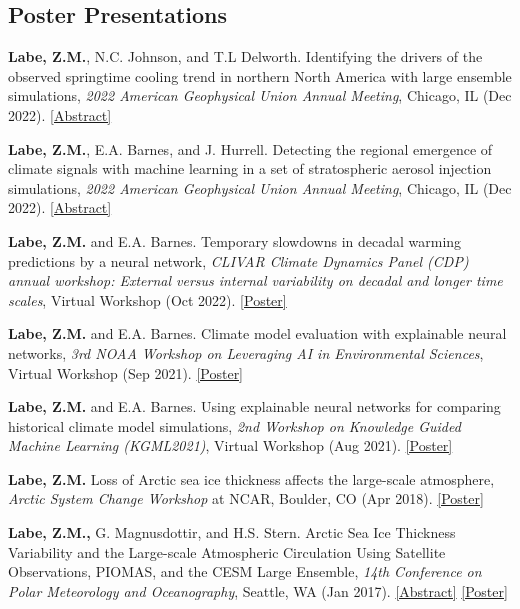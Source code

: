 \documentclass[margin,line,palatino,courier,10pt]{res}
\begin{document}
\begin{resume}
\section{\sc \textcolor{Cerulean}{\large{\textbf{Poster Presentations}}}}
\begin{etaremune}[leftmargin=0in,topsep=0in,parsep=0in]
\item \textbf{Labe, Z.M.}, N.C. Johnson, and T.L Delworth. Identifying the drivers of the observed springtime cooling trend in northern North America with large ensemble simulations, \textit{2022 American Geophysical Union Annual Meeting}, Chicago, IL (Dec 2022). \href{https://agu.confex.com/agu/fm22/meetingapp.cgi/Paper/1111909}{[Abstract]}
\item \textbf{Labe, Z.M.}, E.A. Barnes, and J. Hurrell. Detecting the regional emergence of climate signals with machine learning in a set of stratospheric aerosol injection simulations, \textit{2022 American Geophysical Union Annual Meeting}, Chicago, IL (Dec 2022). \href{https://agu.confex.com/agu/fm22/meetingapp.cgi/Paper/1110391}{[Abstract]}
\item \textbf{Labe, Z.M.} and E.A. Barnes. Temporary slowdowns in decadal warming predictions by a neural network, \textit{CLIVAR Climate Dynamics Panel (CDP) annual workshop: External versus internal variability on decadal and longer time scales}, Virtual Workshop (Oct 2022). \href{https://zacklabe.files.wordpress.com/2022/09/labebarnes_poster_10-2022.pdf}{[Poster]}
\item \textbf{Labe, Z.M.} and E.A. Barnes. Climate model evaluation with explainable neural networks, \textit{3rd NOAA Workshop on Leveraging AI in Environmental Sciences}, Virtual Workshop (Sep 2021). \href{https://zacklabe.files.wordpress.com/2022/08/b875c-labebarnes_noaa-aies_2021_poster.pdf}{[Poster]}
\item \textbf{Labe, Z.M.} and E.A. Barnes. Using explainable neural networks for comparing historical climate model simulations, \textit{2nd Workshop on Knowledge Guided Machine Learning (KGML2021)}, Virtual Workshop (Aug 2021). \href{https://zacklabe.files.wordpress.com/2022/08/aa648-labebarnes_kgml2021_poster_v2_final.pdf}{[Poster]}
\item \textbf{Labe, Z.M.} Loss of Arctic sea ice thickness affects the large-scale atmosphere, \textit{Arctic System Change Workshop} at NCAR, Boulder, CO (Apr 2018). \href{https://zacklabe.files.wordpress.com/2022/08/ff668-zlabe_042018_bigideaposter.pdf}{[Poster]}
\item \textbf{Labe, Z.M.,} G. Magnusdottir, and H.S. Stern. Arctic Sea Ice Thickness Variability and the Large-scale Atmospheric Circulation Using Satellite Observations, PIOMAS, and the CESM Large Ensemble, \textit{14th Conference on Polar Meteorology and Oceanography}, Seattle, WA (Jan 2017). \href{https://ams.confex.com/ams/97Annual/webprogram/Paper313445.html}{[Abstract]} \href{https://zacklabe.files.wordpress.com/2022/08/c332e-zlabemagnusdottirstern_amsposter_2017.pdf}{[Poster]}

\end{etaremune}
\end{resume}
\end{document}

